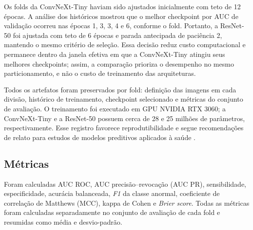 Os folds da ConvNeXt-Tiny haviam sido ajustados inicialmente com teto de 12
épocas. A análise dos históricos mostrou que o melhor checkpoint por AUC de
validação ocorreu nas épocas 1, 3, 3, 4 e 6, conforme o fold. Portanto, a
ResNet-50 foi ajustada com teto de 6 épocas e parada antecipada de paciência 2,
mantendo o mesmo critério de seleção. Essa decisão reduz custo computacional e
permanece dentro da janela efetiva em que a ConvNeXt-Tiny atingiu seus melhores
checkpoints; assim, a comparação prioriza o desempenho no mesmo particionamento,
e não o custo de treinamento das arquiteturas.

Todos os artefatos foram preservados por fold: definição das imagens em cada
divisão, histórico de treinamento, checkpoint selecionado e métricas do conjunto
de avaliação. O treinamento foi executado em GPU NVIDIA RTX 3060; a
ConvNeXt-Tiny e a ResNet-50 possuem cerca de 28 e 25 milhões de parâmetros,
respectivamente. Esse registro favorece reprodutibilidade e segue recomendações de
relato para estudos de modelos preditivos aplicados à saúde
\cite{collins2024tripod,tejani2024claim}.

\subsection{Métricas}

Foram calculadas AUC ROC, AUC precisão--revocação (AUC PR), sensibilidade,
especificidade, acurácia balanceada, \emph{F1} da classe anormal, coeficiente de
correlação de Matthews (MCC), kappa de Cohen e \emph{Brier score}. Todas as
métricas foram calculadas separadamente no conjunto de avaliação de cada fold e
resumidas como média e desvio-padrão.
